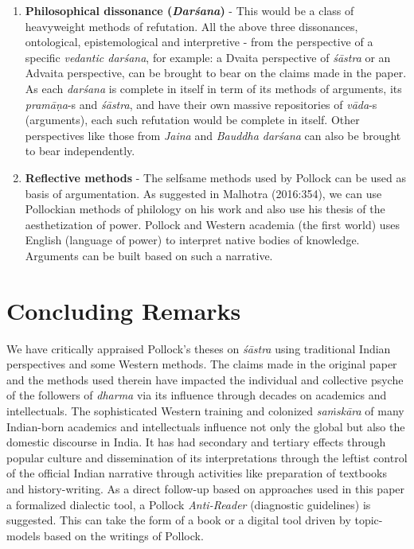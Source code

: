 \begin{enumerate}
\item {\bf Philosophical dissonance ({{\sl\bfseries Darśana}\relax})} - This would be a class of heavyweight methods of refutation. All the above three dissonances, ontological, epistemological and interpretive - from the perspective of a specific {\sl vedantic darśana}, for example: a Dvaita perspective of {\sl śāstra} or an Advaita perspective, can be brought to bear on the claims made in the paper. As each {\sl darśana} is complete in itself in term of its methods of arguments, its {\sl pramāṇa}-s and {\sl śāstra}, and have their own massive repositories of {\sl vāda}-s (arguments), each such refutation would be complete in itself. Other perspectives like those from {\sl Jaina} and {\sl Bauddha darśana} can also be brought to bear independently.

\item {\bf Reflective methods} - The selfsame methods used by Pollock can be used as basis of argumentation. As suggested in Malhotra (2016:354), we can use Pollockian methods of philology on his work and also use his thesis of the aesthetization of power. Pollock and Western academia (the first world) uses English (language of power) to interpret native bodies of knowledge. Arguments can be built based on such a narrative.
\end{enumerate}

\section*{Concluding Remarks}

We have critically appraised Pollock's theses on {\sl śāstra} using traditional Indian perspectives and some Western methods. The claims made in the original paper and the methods used therein have impacted the individual and collective psyche of the followers of {\sl dharma} via its influence through decades on academics and intellectuals. The sophisticated Western training and colonized {\sl saṁskāra} of many Indian-born academics and intellectuals influence not only the global but also the domestic discourse in India. It has had secondary and tertiary effects through popular culture and dissemination of its interpretations through the leftist control of the official Indian narrative through activities like preparation of textbooks and history-writing. As a direct follow-up based on approaches used in this paper a formalized dialectic tool, a Pollock {\sl Anti-Reader} (diagnostic guidelines) is suggested. This can take the form of a book or a digital tool driven by topic-models based on the writings of Pollock.


